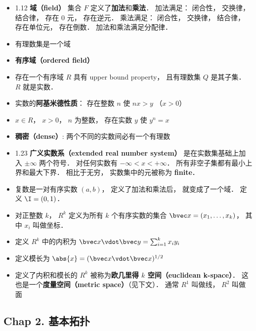 \begin{itemize}
\item 1.12 \textbf{域（field）} 集合 $F$ 定义了\textbf{加法}和\textbf{乘法}． 加法满足： 闭合性， 交换律， 结合律， 存在 0 元， 存在逆元． 乘法满足： 闭合性， 交换律， 结合律， 存在单位元， 存在倒数． 加法和乘法满足分配律．

\item 有理数集是一个域

\item \textbf{有序域（ordered field）}

\item 存在一个有序域 $R$ 具有 upper bound property， 且有理数集 $Q$ 是其子集． $R$ 就是实数．

\item 实数的\textbf{阿基米德性质}： 存在整数 $n$ 使 $nx > y$ （$x > 0$）

\item $x \in R$， $x > 0$， $n$ 为整数， 存在实数 $y$ 使 $y^n = x$

\item \textbf{稠密（dense）}: 两个不同的实数间必有一个有理数

\item 1.23 \textbf{广义实数系（extended real number system）} 是在实数集基础上加入 $\pm\infty$ 两个符号． 对任何实数有 $-\infty < x < +\infty$． 所有非空子集都有最小上界和最大下界． 相比于无穷， 实数集中的元被称为 \textbf{finite}．

\item 复数是一对有序实数 $(a, b)$， 定义了加法和乘法后， 就变成了一个域． 定义 $\I = (0, 1)$．

\item 对正整数 $k$， $R^k$ 定义为所有 $k$ 个有序实数的集合 $\bvec x = (x_1, \dots, x_k)$， 其中 $x_i$ 叫做坐标．

\item 定义 $R^k$ 中的内积为 $\bvec x \vdot \bvec y = \sum_{i = 1}^k x_i y_i$

\item 定义模长为 $\abs{x} = (\bvec x \vdot \bvec x)^{1/2}$

\item 定义了内积和模长的 $R^k$ 被称为\textbf{欧几里得 $k$ 空间（euclidean k-space）}． 这也是一个\textbf{度量空间（metric space）}（见下文）． 通常 $R^1$ 叫做线， $R^2$ 叫做面
\end{itemize}

\subsection{Chap 2. 基本拓扑}

